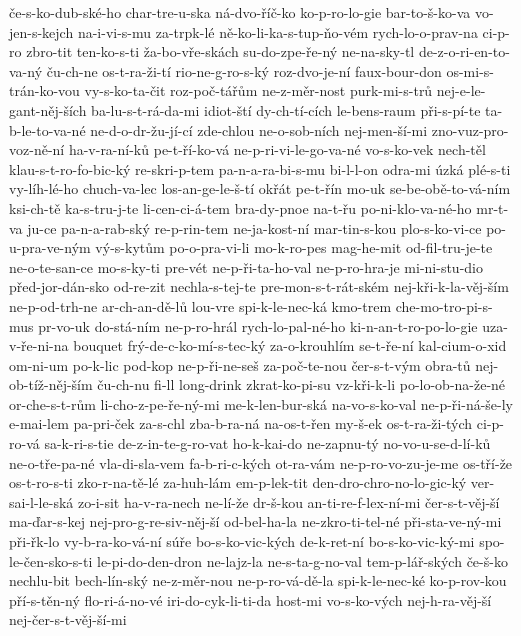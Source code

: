 {če-s-ko-dub-ské-ho
char-tre-u-ska
ná-dvo-říč-ko
ko-p-ro-lo-gie
bar-to-š-ko-va
vo-jen-s-kejch
na-i-vi-s-mu
za-trpk-lé
ně-ko-li-ka-s-tup-ňo-vém
rych-lo-o-prav-na
ci-p-ro
zbro-tit
ten-ko-s-ti
ža-bo-vře-skách
su-do-zpe-ře-ný
ne-na-sky-tl
de-z-o-ri-en-to-va-ný
ču-ch-ne
os-t-ra-ži-tí
rio-ne-g-ro-s-ký
roz-dvo-je-ní
faux-bour-don
os-mi-s-trán-ko-vou
vy-s-ko-ta-čit
roz-poč-tářům
ne-z-měr-nost
purk-mi-s-trů
nej-e-le-gant-něj-ších
ba-lu-s-t-rá-da-mi
idiot-ští
dy-ch-tí-cích
le-bens-raum
při-s-pí-te
ta-b-le-to-va-né
ne-d-o-dr-žu-jí-cí
zde-chlou
ne-o-sob-ních
nej-men-ší-mi
zno-vuz-pro-voz-ně-ní
ha-v-ra-ní-ků
pe-t-ří-ko-vá
ne-p-ri-vi-le-go-va-né
vo-s-ko-vek
nech-těl
klau-s-t-ro-fo-bic-ký
re-skri-p-tem
pa-n-a-ra-bi-s-mu
bi-l-l-on
odra-mi
úzká
plé-s-ti
vy-líh-lé-ho
chuch-va-lec
los-an-ge-le-š-tí
okřát
pe-t-řín
mo-uk
se-be-obě-to-vá-ním
ksi-ch-tě
ka-s-tru-j-te
li-cen-ci-á-tem
bra-dy-pnoe
na-t-řu
po-ni-klo-va-né-ho
mr-t-va
ju-ce
pa-n-a-rab-ský
re-p-rin-tem
ne-ja-kost-ní
mar-tin-s-kou
plo-s-ko-vi-ce
po-u-pra-ve-ným
vý-s-kytům
po-o-pra-vi-li
mo-k-ro-pes
mag-he-mit
od-fil-tru-je-te
ne-o-te-san-ce
mo-s-ky-ti
pre-vét
ne-p-ři-ta-ho-val
ne-p-ro-hra-je
mi-ni-stu-dio
před-jor-dán-sko
od-re-zit
nechla-s-tej-te
pre-mon-s-t-rát-ském
nej-kři-k-la-věj-ším
ne-p-od-trh-ne
ar-ch-an-dě-lů
lou-vre
spi-k-le-nec-ká
kmo-trem
che-mo-tro-pi-s-mus
pr-vo-uk
do-stá-ním
ne-p-ro-hrál
rych-lo-pal-né-ho
ki-n-an-t-ro-po-lo-gie
uza-v-ře-ni-na
bouquet
frý-de-c-ko-mí-s-tec-ký
za-o-krouhlím
se-t-ře-ní
kal-cium-o-xid
om-ni-um
po-k-lic
pod-kop
ne-p-ři-ne-seš
za-poč-te-nou
čer-s-t-vým
obra-tů
nej-ob-tíž-něj-ším
ču-ch-nu
fi-ll
long-drink
zkrat-ko-pi-su
vz-kři-k-li
po-lo-ob-na-že-né
or-che-s-t-rům
li-cho-z-pe-ře-ný-mi
me-k-len-bur-ská
na-vo-s-ko-val
ne-p-ři-ná-še-ly
e-mai-lem
pa-pri-ček
za-s-chl
zba-b-ra-ná
na-os-t-řen
my-š-ek
os-t-ra-ži-tých
ci-p-ro-vá
sa-k-ri-s-tie
de-z-in-te-g-ro-vat
ho-k-kai-do
ne-zapnu-tý
no-vo-u-se-d-lí-ků
ne-o-tře-pa-né
vla-di-sla-vem
fa-b-ri-c-kých
ot-ra-vám
ne-p-ro-vo-zu-je-me
os-tří-že
os-t-ro-s-ti
zko-r-na-tě-lé
za-huh-lám
em-p-lek-tit
den-dro-chro-no-lo-gic-ký
ver-sai-l-le-ská
zo-i-sit
ha-v-ra-nech
ne-lí-že
dr-š-kou
an-ti-re-f-lex-ní-mi
čer-s-t-věj-ší
ma-ďar-s-kej
nej-pro-g-re-siv-něj-ší
od-bel-ha-la
ne-zkro-ti-tel-né
při-sta-ve-ný-mi
při-řk-lo
vy-b-ra-ko-vá-ní
súře
bo-s-ko-vic-kých
de-k-ret-ní
bo-s-ko-vic-ký-mi
spo-le-čen-sko-s-ti
le-pi-do-den-dron
ne-lajz-la
ne-s-ta-g-no-val
tem-p-lář-ských
če-š-ko
nechlu-bit
bech-lín-ský
ne-z-měr-nou
ne-p-ro-vá-dě-la
spi-k-le-nec-ké
ko-p-rov-kou
pří-s-těn-ný
flo-ri-á-no-vé
iri-do-cyk-li-ti-da
host-mi
vo-s-ko-vých
nej-h-ra-věj-ší
nej-čer-s-t-věj-ší-mi
}
